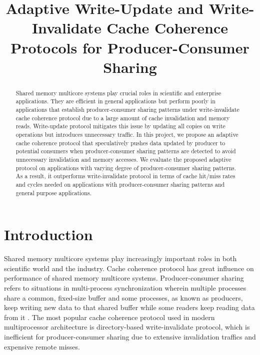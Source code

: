 \documentclass[conference]{IEEEtran}
\begin{document}
%
\title{Adaptive Write-Update and Write-Invalidate Cache Coherence Protocols for Producer-Consumer Sharing}


\author{
\and
{}
}

\maketitle


\begin{abstract}
Shared memory multicore systems play crucial roles in scientific and enterprise applications. They are efficient in general applications but perform poorly in applications that establish producer-consumer sharing patterns under write-invalidate cache coherence protocol due to a large amount of cache invalidation and memory reads. Write-update protocol mitigates this issue by updating all copies on write operations but introduces unnecessary traffic. In this project, we propose an adaptive cache coherence protocol that speculatively pushes data updated by producer to potential consumers when producer-consumer sharing patterns are detected to avoid unnecessary invalidation and memory accesses. We evaluate the proposed adaptive protocol on applications with varying degree of producer-consumer sharing patterns. As a result, it outperforms write-invalidate protocol in terms of cache hit/miss rates and cycles needed on applications with producer-consumer sharing patterns and general purpose applications.
\end{abstract}


\section{Introduction}
Shared memory multicore systems play increasingly important roles in both scientific world and the industry. Cache coherence protocol has great influence on performance of shared memory multicore systems. Producer-consumer sharing refers to situations in multi-process synchronization wherein multiple processes share a common, fixed-size buffer and some processes, as known as producers, keep writing new data to that shared buffer while some readers keep reading data from it \cite{wiki}. The most popular cache coherence protocol used in modern multiprocessor architecture is directory-based write-invalidate protocol, which is inefficient for producer-consumer sharing due to extensive invalidation traffics and expensive remote misses.
\end{document}
